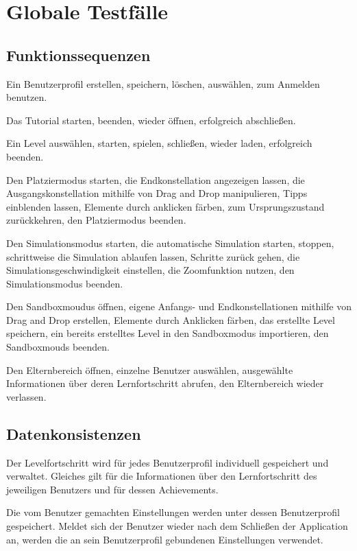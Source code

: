 \section{Globale Testfälle}

\subsection{Funktionssequenzen}

\begin{requirements}

	 Ein Benutzerprofil erstellen, speichern, löschen, auswählen, zum Anmelden benutzen.
  	
   Das Tutorial starten, beenden, wieder öffnen, erfolgreich abschließen.
  	
   Ein Level auswählen, starten, spielen, schließen, wieder laden, erfolgreich beenden.
  	
   Den Platziermodus starten, die Endkonstellation angezeigen lassen, die Ausgangskonstellation mithilfe von Drag and Drop manipulieren, Tipps einblenden lassen, Elemente durch anklicken färben, zum Ursprungszustand zurückkehren, den Platziermodus beenden.
  
   Den Simulationsmodus starten, die automatische Simulation starten, stoppen, schrittweise die Simulation ablaufen lassen, Schritte zurück gehen, die Simulationsgeschwindigkeit einstellen, die Zoomfunktion nutzen, den Simulationsmodus beenden.
  	
   Den Sandboxmoudus öffnen, eigene Anfangs- und Endkonstellationen mithilfe von Drag and Drop erstellen, Elemente durch Anklicken färben, das erstellte Level speichern, ein bereits erstelltes Level in den Sandboxmodus importieren, den Sandboxmouds beenden.
  
   Den Elternbereich öffnen, einzelne Benutzer auswählen, ausgewählte Informationen über deren Lernfortschritt abrufen, den Elternbereich wieder verlassen.
  		
\end{requirements}
  		
\subsection{Datenkonsistenzen}

\begin{requirements}
  		
   Der Levelfortschritt wird für jedes Benutzerprofil individuell gespeichert und verwaltet. Gleiches gilt für die Informationen über den Lernfortschritt des jeweiligen Benutzers und für dessen Achievements.
  		
	 Die vom Benutzer gemachten Einstellungen werden unter dessen Benutzerprofil gespeichert. Meldet sich der Benutzer wieder nach dem Schließen der Application an, werden die an sein Benutzerprofil gebundenen Einstellungen verwendet.

\end{requirements}	
